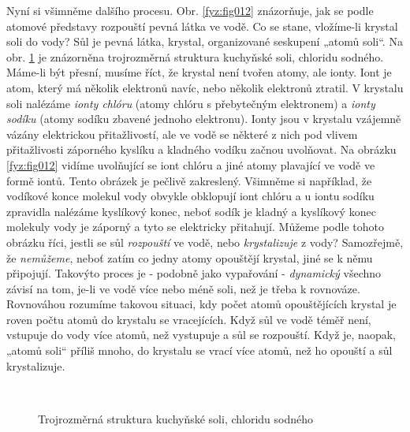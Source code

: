     Nyní si všimněme dalšího procesu. Obr. \ref{fyz:fig012} znázorňuje, jak se podle atomové
    představy rozpouští pevná látka ve vodě. Co se stane, vložíme-li krystal soli do vody? Sůl je
    pevná látka, krystal, organizované seskupení „atomů soli“. Na obr. \ref{fyz:fig013} je
    znázorněna trojrozměrná struktura kuchyňské soli, chloridu sodného. Máme-li být přesní, musíme
    říct, že krystal není tvořen atomy, ale ionty. Iont je atom, který má několik elektronů navíc,
    nebo několik elektronů ztratil. V krystalu soli nalézáme \emph{ionty chlóru} (atomy chlóru s
    přebytečným elektronem) a \emph{ionty sodíku} (atomy sodíku zbavené jednoho elektronu). Ionty
    jsou v krystalu vzájemně vázány elektrickou přitažlivostí, ale ve vodě se některé z nich pod
    vlivem přitažlivosti záporného kyslíku a kladného vodíku začnou uvolňovat. Na obrázku
    \ref{fyz:fig012} vidíme uvolňující se iont chlóru a jiné atomy plavající ve vodě ve formě iontů.
    Tento obrázek je pečlivě zakreslený. Všimněme si například, že vodíkové konce molekul vody
    obvykle obklopují iont chlóru a u iontu sodíku zpravidla nalézáme kyslíkový konec, neboť sodík
    je kladný a kyslíkový konec molekuly vody je záporný a tyto se elektricky přitahují. Můžeme
    podle tohoto obrázku říci, jestli se sůl \emph{rozpouští} ve vodě, nebo \emph{krystalizuje} z
    vody? Samozřejmě, že \emph{nemůžeme}, neboť zatím co jedny atomy opouštějí krystal, jiné se k
    němu připojují. Takovýto proces je - podobně jako vypařování - \emph{dynamický} všechno závisí
    na tom, je-li ve vodě více nebo méně soli, než je třeba k rovnováze. Rovnováhou rozumíme takovou
    situaci, kdy počet atomů opouštějících krystal je roven počtu atomů do krystalu se vracejících.
    Když sůl ve vodě téměř není, vstupuje do vody více atomů, než vystupuje a sůl se rozpouští. Když
    je, naopak, „atomů soli“ příliš mnoho, do krystalu se vrací více atomů, než ho opouští a sůl
    krystalizuje.

    \begin{figure}[ht!]  %
      \centering
          {}                                                      \\                                   
          {}
      \caption{Trojrozměrná struktura kuchyňské soli, chloridu sodného\cite[s.~22]{Feynman01}}
      \label{fyz:fig013}
    \end{figure}
    

